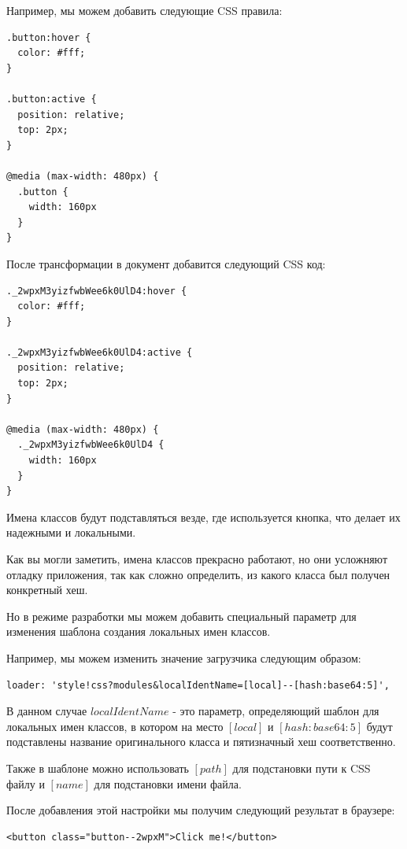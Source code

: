 Например, мы можем добавить следующие CSS правила:

\begin{lstlisting}
.button:hover {
  color: #fff;
}

.button:active {
  position: relative;
  top: 2px;
}

@media (max-width: 480px) {
  .button {
    width: 160px
  }
}
\end{lstlisting}

После трансформации в документ добавится следующий CSS код:

\begin{lstlisting}
._2wpxM3yizfwbWee6k0UlD4:hover {
  color: #fff;
}

._2wpxM3yizfwbWee6k0UlD4:active {
  position: relative;
  top: 2px;
}

@media (max-width: 480px) {
  ._2wpxM3yizfwbWee6k0UlD4 {
    width: 160px
  }
}
\end{lstlisting}

Имена классов будут подставляться везде, где используется кнопка, что делает их надежными и локальными.

Как вы могли заметить, имена классов прекрасно работают, но они усложняют отладку приложения, так как сложно определить, из какого класса был получен конкретный хеш.

Но в режиме разработки мы можем добавить специальный параметр для изменения шаблона создания локальных имен классов.

Например, мы можем изменить значение загрузчика следующим образом:

\begin{lstlisting}
loader: 'style!css?modules&localIdentName=[local]--[hash:base64:5]',
\end{lstlisting}

В данном случае $localIdentName$ - это параметр, определяющий шаблон для локальных имен классов, в котором на место $[local]$ и $[hash:base64:5]$ будут подставлены название оригинального класса и пятизначный хеш соответственно.

Также в шаблоне можно использовать $[path]$ для подстановки пути к CSS файлу и $[name]$ для подстановки имени файла.

После добавления этой настройки мы получим следующий результат в браузере:

\begin{lstlisting}
<button class="button--2wpxM">Click me!</button>
\end{lstlisting}

